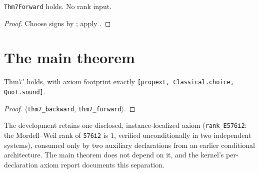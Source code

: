 \begin{theorem}\label{thm:forward}
\leanok
{}
\texttt{Thm7Forward} holds.  No rank input.
\end{theorem}
\begin{proof}\leanok
Choose signs by ; apply .
\end{proof}

\section{The main theorem}

\begin{theorem}\label{thm:main}
\leanok
{}
$\mathrm{Thm7'}$ holds, with axiom footprint exactly
\texttt{[propext, Classical.choice, Quot.sound]}.
\end{theorem}
\begin{proof}\leanok
$\langle$\texttt{thm7\_backward}, \texttt{thm7\_forward}$\rangle$.
\end{proof}

\begin{remark}\label{rem:rank}
The development retains one disclosed, instance-localized axiom
(\texttt{rank\_E576i2}: the Mordell--Weil rank of \texttt{576i2} is $1$,
verified unconditionally in two independent systems), consumed only by
two auxiliary declarations from an earlier conditional architecture.
The main theorem does not depend on it, and the kernel's
per-declaration axiom report documents this separation.
\end{remark}
